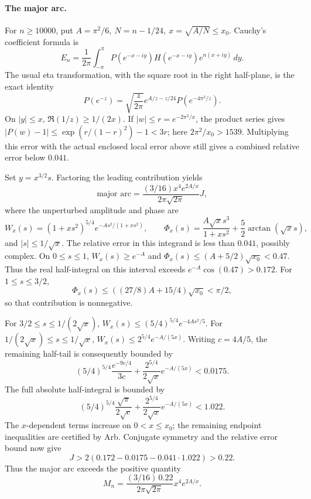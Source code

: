 \documentclass[11pt]{article}
\begin{document}
\paragraph{The major arc.}
For \(n\geq10000\), put \(A=\pi^2/6,\ N=n-1/24,\ x=\sqrt{A/N}\leq x_0\).
Cauchy's coefficient formula is
\[
 E_n=\frac1{2\pi}\int_{-\pi}^{\pi}
 P(e^{-x-iy})H(e^{-x-iy})e^{n(x+iy)}\,dy.
\]
The usual eta transformation, with the square root in the right half-plane,
is the exact identity
\begin{equation}\label{eta}
 P(e^{-z})=\sqrt{\frac z{2\pi}}e^{A/z-z/24}
          P(e^{-4\pi^2/z}).
\end{equation}
On \(|y|\leq x\), \(\Re(1/z)\geq1/(2x)\).
If \(|w|\leq r=e^{-2\pi^2/x}\), the product series gives
\(|P(w)-1|\leq \exp(r/(1-r)^2)-1<3r\);
here \(2\pi^2/x_0>1539\).
Multiplying this error with the actual enclosed local error above still
gives a combined relative error below \(0.041\).

Set \(y=x^{3/2}s\). Factoring the leading contribution yields
\[
 \text{major arc}=\frac{(3/16)x^4e^{2A/x}}{2\pi\sqrt{2\pi}}J,
\]
where the unperturbed amplitude and phase are
\[
 W_x(s)=(1+xs^2)^{5/4}e^{-As^2/(1+xs^2)},\qquad
 \Phi_x(s)=\frac{A\sqrt{x}s^3}{1+xs^2}
                     +\frac52\arctan(\sqrt{x}s),
\]
and \(|s|\leq1/\sqrt{x}\). The relative error in this integrand is less
than \(0.041\), possibly complex.
On \(0\leq s\leq1\), \(W_x(s)\geq e^{-A}\) and
\(\Phi_x(s)\leq(A+5/2)\sqrt{x_0}<0.47\). Thus the real half-integral
on this interval exceeds \(e^{-A}\cos(0.47)>0.172\).
For \(1\leq s\leq3/2\),
\[
 \Phi_x(s)\leq ((27/8)A+15/4)\sqrt{x_0}<\pi/2,
\]
so that contribution is nonnegative.

For \(3/2\leq s\leq1/(2\sqrt{x})\),
\(W_x(s)\leq(5/4)^{5/4}e^{-4As^2/5}\).
For \(1/(2\sqrt{x})\leq s\leq1/\sqrt{x}\),
\(W_x(s)\leq2^{5/4}e^{-A/(5x)}\).
Writing \(c=4A/5\), the remaining half-tail is consequently bounded by
\[
 (5/4)^{5/4}\frac{e^{-9c/4}}{3c}
 +\frac{2^{5/4}}{2\sqrt{x}}e^{-A/(5x)}<0.0175.
\]
The full absolute half-integral is bounded by
\[
 (5/4)^{5/4}\frac{\sqrt\pi}{2\sqrt c}
 +\frac{2^{5/4}}{2\sqrt{x}}e^{-A/(5x)}<1.022.
\]
The \(x\)-dependent terms increase on \(0<x\leq x_0\);
the remaining endpoint inequalities are certified by Arb.
Conjugate symmetry and the relative error bound now give
\[
 J>2(0.172-0.0175-0.041\cdot1.022)>0.22 .
\]
Thus the major arc exceeds the positive quantity
\begin{equation}\label{M}
 M_n=\frac{(3/16)\,0.22}{2\pi\sqrt{2\pi}}x^4e^{2A/x}.
\end{equation}
\end{document}
